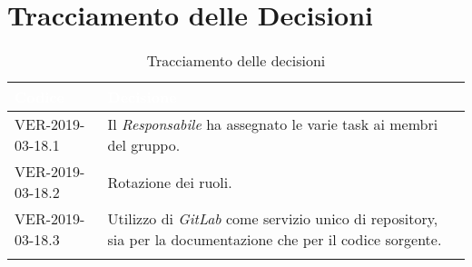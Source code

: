 \newpage
\section{Tracciamento delle Decisioni}

\begin{longtable}{|C{.40\textwidth}|C{.60\textwidth}|}
\hline
{}\textbf{\textcolor{white}{Codice}} & \textbf{\textcolor{white}{Decisione}}\\
\hline
VER-2019-03-18.1 & Il \textit{Responsabile} ha assegnato le varie task ai membri del gruppo. \\
\hline
{}VER-2019-03-18.2 & Rotazione dei ruoli. \\
\hline
VER-2019-03-18.3 & Utilizzo di \textit{GitLab} come servizio unico di repository, sia per la documentazione che per il codice sorgente. \\
\hline

\caption{Tracciamento delle decisioni}
\end{longtable}
